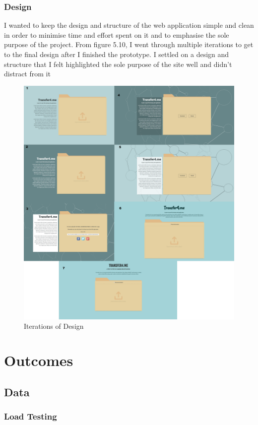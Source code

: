 \documentclass[]{report}
\begin{document}
			\subsection{Design}
			 I wanted to keep the design and structure of the web application simple and clean in order to minimise time and effort spent on it and to emphasise the sole purpose of the project. From figure 5.10, I went through multiple iterations to get to the final design after I finished the prototype. I settled on a design and structure that I felt highlighted the sole purpose of the site well and didn't distract from it
	
			\begin{figure}[H]
				\caption{Iterations of Design}
				\centering
				\includegraphics[scale=0.15]{design.png}
			\end{figure}
			
	\chapter{Outcomes}
		\section{Data}
			\subsection{Load Testing}
\end{document}
